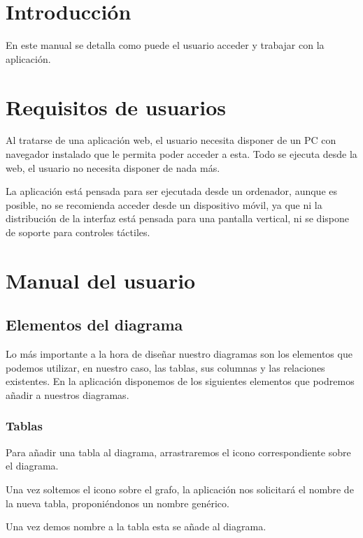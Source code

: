 
\section{Introducción}
En este manual se detalla como puede el usuario acceder y trabajar con la aplicación.

\section{Requisitos de usuarios}
Al tratarse de una aplicación web, el usuario necesita disponer de un PC con navegador instalado que le permita poder acceder a esta. Todo se ejecuta desde la web, el usuario no necesita disponer de nada más.

La aplicación está pensada para ser ejecutada desde un ordenador, aunque es posible, no se recomienda acceder desde un dispositivo móvil, ya que ni la distribución de la interfaz está pensada para una pantalla vertical, ni se dispone de soporte para controles táctiles.

\section{Manual del usuario}


\subsection{Elementos del diagrama}
Lo más importante a la hora de diseñar nuestro diagramas son los elementos que podemos utilizar, en nuestro caso, las tablas, sus columnas y las relaciones existentes. En la aplicación disponemos de los siguientes elementos que podremos añadir a nuestros diagramas.

\subsubsection{Tablas}
Para añadir una tabla al diagrama, arrastraremos el icono correspondiente sobre el diagrama.


Una vez soltemos el icono sobre el grafo, la aplicación nos solicitará el nombre de la nueva tabla, proponiéndonos un nombre genérico.


Una vez demos nombre a la tabla esta se añade al diagrama.

